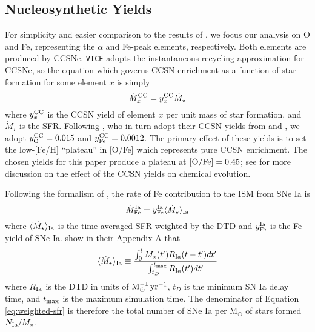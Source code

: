 \documentclass[twocolumn,twocolappendix,linenumbers,trackchanges]{aastex631}
\newcommand{\vice}{{\tt VICE}\xspace}
\begin{document}
\subsection{Nucleosynthetic Yields}
\label{sec:yields}

For simplicity and easier comparison to the results of , we focus our analysis on O and Fe, representing the $\alpha$ and Fe-peak elements, respectively. Both elements are produced by CCSNe. \vice adopts the instantaneous recycling approximation for CCSNe, so the equation which governs CCSN enrichment as a function of star formation for some element $x$ is simply
\begin{equation}
    \dot M_x^{\rm CC} = y_x^{\rm CC} \dot M_\star
    \label{eq:ccsn-enrichment}
\end{equation}
where $y_x^{\rm CC}$ is the CCSN yield of element $x$ per unit mass of star formation, and $\dot M_\star$ is the SFR. 
Following , who in turn adopt their CCSN yields from \citet{ChieffiLimongi2004-CCSNYields} and \citet{LimongiChieffi2006-CCSNYields}, we adopt $y_{\rm O}^{\rm CC}=0.015$ and $y_{\rm Fe}^{\rm CC}=0.0012$. The primary effect of these yields is to set the low-[Fe/H] ``plateau'' in [O/Fe] which represents pure CCSN enrichment. The chosen yields for this paper produce a plateau at ${\rm [O/Fe]}=0.45$; see \citet{Weinberg2023-CCSNYield} for more discussion on the effect of the CCSN yields on chemical evolution.

Following the formalism of \citet{Weinberg2017-ChemicalEquilibrium}, the rate of Fe contribution to the ISM from SNe Ia is 
\begin{equation}
    \dot M_{\rm Fe}^{\rm Ia} = y_{\rm Fe}^{\rm Ia} \langle \dot M_\star\rangle_{\rm Ia} \\
\end{equation}
where $\langle \dot M_\star\rangle_{\rm Ia}$ is the time-averaged SFR weighted by the DTD and $y_{\rm Fe}^{\rm Ia}$ is the Fe yield of SNe Ia. \citet{Weinberg2017-ChemicalEquilibrium} show in their Appendix A that
\begin{equation}
    \langle \dot M_\star\rangle_{\rm Ia} \equiv \frac{\int_0^t \dot M_\star(t')R_{\rm Ia}(t-t')dt'}{\int_{t_D}^{t_{\rm max}} R_{\rm Ia}(t')dt'}
    \label{eq:weighted-sfr}
\end{equation}
where %
$R_{\rm Ia}$ is the DTD in units of ${\rm M}_\odot^{-1}\,{\rm yr}^{-1}$,
$t_D$ is the minimum SN Ia delay time, and $t_{\rm max}$ is the maximum simulation time. The denominator of Equation \ref{eq:weighted-sfr} is therefore the total number of SNe Ia per M$_{\odot}$ of stars formed $N_{\rm Ia}/M_\star$.
\end{document}

